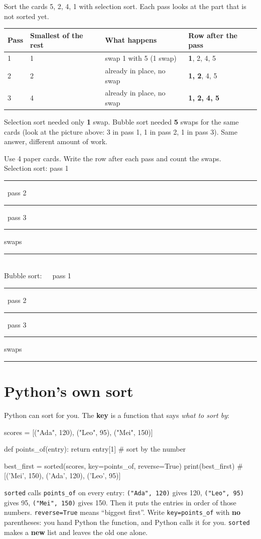 \begin{workedexample}
Sort the cards 5, 2, 4, 1 with selection sort. Each pass looks at the part that is not sorted yet.
\begin{center}
\renewcommand{\arraystretch}{1.25}
\begin{tabular}{@{}llll@{}}
\toprule
\textbf{Pass} & \textbf{Smallest of the rest} & \textbf{What happens} & \textbf{Row after the pass} \\ \midrule
1 & 1 & swap 1 with 5 (1 swap) & \textbf{1}, 2, 4, 5 \\
2 & 2 & already in place, no swap & \textbf{1, 2}, 4, 5 \\
3 & 4 & already in place, no swap & \textbf{1, 2, 4, 5} \\
\bottomrule
\end{tabular}
\end{center}
Selection sort needed only \textbf{1} swap. Bubble sort needed \textbf{5} swaps for the same cards (look at the picture above: 3 in pass 1, 1 in pass 2, 1 in pass 3). Same answer, different amount of work.
\end{workedexample}

\begin{tip}
Use 4 paper cards. Write the row after each pass and count the swaps.\\[2pt]
Selection sort: pass 1 \rule{2.2cm}{0.4pt}\ pass 2 \rule{2.2cm}{0.4pt}\ pass 3 \rule{2.2cm}{0.4pt}\quad swaps \rule{1cm}{0.4pt}\\[4pt]
Bubble sort:\ \ \ pass 1 \rule{2.2cm}{0.4pt}\ pass 2 \rule{2.2cm}{0.4pt}\ pass 3 \rule{2.2cm}{0.4pt}\quad swaps \rule{1cm}{0.4pt}
\end{tip}

\section{Python's own sort}
Python can sort for you. The \textbf{key} is a function that says \emph{what to sort by}:
\begin{pycode}
scores = [("Ada", 120), ("Leo", 95), ("Mei", 150)]

def points_of(entry):
    return entry[1]                  # sort by the number

best_first = sorted(scores, key=points_of, reverse=True)
print(best_first)   # [('Mei', 150), ('Ada', 120), ('Leo', 95)]
\end{pycode}
\texttt{sorted} calls \texttt{points\_of} on every entry: \texttt{("Ada", 120)} gives 120, \texttt{("Leo", 95)} gives 95, \texttt{("Mei", 150)} gives 150. Then it puts the entries in order of those numbers. \texttt{reverse=True} means \enquote{biggest first}. Write \texttt{key=points\_of} with \textbf{no} parentheses: you hand Python the function, and Python calls it for you.
\texttt{sorted} makes a \textbf{new} list and leaves the old one alone.

